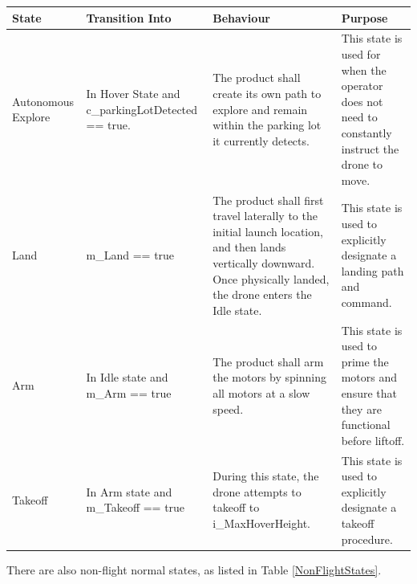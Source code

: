 \documentclass[12pt, titlepage]{article}
\begin{document}
\begin{table}[!h]
\begin{center}
\begin{tabular}{ | m{2.1cm} | m{3cm} | m{6cm} | m{4cm} | } 
\hline
 State & Transition Into & Behaviour & Purpose \\ 
\hline Autonomous Explore & In Hover State and c_parkingLotDetected == true. & 
    The product shall create its own path to explore and remain within the parking lot it currently detects. & 
    This state is used for when the operator does not need to constantly instruct the drone to move. \\
\hline Land & m_Land == true & 
    The product shall first travel laterally to the initial launch location, and then lands vertically downward. Once physically landed, the drone enters the Idle state. & 
    This state is used to explicitly designate a landing path and command. \\
\hline Arm & In Idle state and m_Arm == true & 
    The product shall arm the motors by spinning all motors at a slow speed. & 
    This state is used to prime the motors and ensure that they are functional before liftoff. \\
\hline Takeoff & In Arm state and m_Takeoff == true & 
    During this state, the drone attempts to takeoff to i_MaxHoverHeight. & 
    This state is used to explicitly designate a takeoff procedure. \\
\hline 
\end{tabular}
\end{center}
\end{table}

\clearpage

There are also non-flight normal states, as listed in Table \ref{NonFlightStates}.
\end{document}
